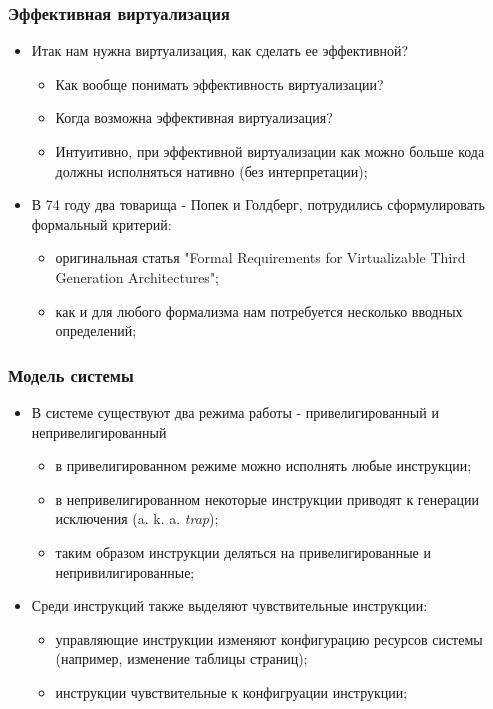 \begin{frame}
\frametitle{Эффективная виртуализация}
\begin{itemize}
  \item<1-> Итак нам нужна виртуализация, как сделать ее эффективной?
    \begin{itemize}
      \item Как вообще понимать эффективность виртуализации?
      \item Когда возможна эффективная виртуализация?
      \item Интуитивно, при эффективной виртуализации как можно больше кода
            должны исполняться нативно (без интерпретации);
    \end{itemize}
  \item<2-> В 74 году два товарища - Попек и Голдберг, потрудились
        сформулировать формальный критерий:
    \begin{itemize}
      \item оригинальная статья "Formal Requirements for Virtualizable Third
            Generation Architectures";
      \item как и для любого формализма нам потребуется несколько вводных
            определений;
    \end{itemize}
\end{itemize}
\end{frame}

\begin{frame}
\frametitle{Модель системы}
\begin{itemize}
  \item<1-> В системе существуют два режима работы - привелигированный и
        непривелигированный
    \begin{itemize}
      \item в привелигированном режиме можно исполнять любые инструкции;
      \item в непривелигированном некоторые инструкции приводят к генерации
            исключения (a. k. a. \emph{trap});
      \item таким образом инструкции деляться на привелигированные и
            непривилигированные;
    \end{itemize}
  \item<2-> Среди инструкций также выделяют чувствительные инструкции:
    \begin{itemize}
      \item управляющие инструкции изменяют конфигурацию ресурсов системы
            (например, изменение таблицы страниц);
      \item инструкции чувствительные к конфигруации инструкции;
    \end{itemize}
\end{itemize}
\end{frame}

